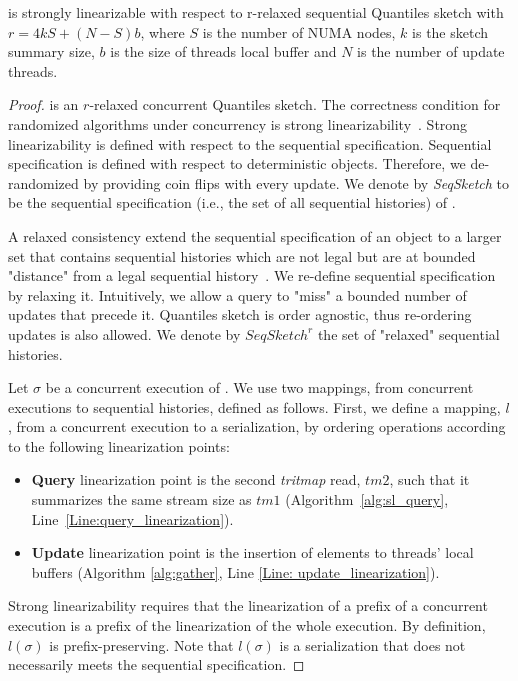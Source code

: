 \begin{lemma} \label{Lem: sl_relaxation}
\mysketch is strongly linearizable with respect to r-relaxed sequential Quantiles sketch with \(r=4kS + (N-S)b\), where $S$ is the number of NUMA nodes, $k$ is the sketch summary size, $b$ is the size of threads local buffer and $N$ is the number of update threads.
\end{lemma}
\begin{proof}
\mysketch is an $r$-relaxed concurrent Quantiles sketch. 
The correctness condition for randomized algorithms under concurrency is strong linearizability~\cite{strong_linearizability}. Strong linearizability is defined with respect to the sequential specification. Sequential specification is defined with respect to deterministic objects. Therefore, we de-randomized \mysketch by providing coin flips with every update. We denote by \emph{SeqSketch} to be the sequential specification (i.e., the set of all sequential histories) of \mysketch.


A relaxed consistency extend the sequential specification of an object to a larger set that contains sequential histories which are not legal but are at bounded "distance" from a legal sequential history~\cite{Henzinger_2013_Quantitative_Relaxation,Afek_2010_Quasi_linearizability,Rinberg_2020_fast_sketches}. We re-define \mysketch sequential specification by relaxing it. Intuitively, we allow a query to "miss" a bounded number of updates that precede it. Quantiles sketch is order agnostic, thus re-ordering updates is also allowed. We denote by $SeqSketch^r$ the set of "relaxed" sequential histories.

Let $\sigma$ be a concurrent execution of \mysketch. We use two mappings, from concurrent executions to sequential histories, defined as follows.
First, we define a mapping, $l$, from a concurrent execution to a serialization, by ordering operations according to the following linearization points:
\begin{itemize}
\item \textbf{Query} linearization point is the second \emph{tritmap} read, $tm2$, such that it summarizes the same stream size as $tm1$ (Algorithm~\ref{alg:sl_query}, Line~\ref{Line:query_linearization}).
\item \textbf{Update} linearization point is the insertion of elements to threads' local buffers (Algorithm \ref{alg:gather}, Line \ref{Line: update_linearization}).
\end{itemize}

Strong linearizability requires that the linearization of a prefix of a concurrent execution is a prefix of the linearization of the whole execution. By definition, $l(\sigma)$ is prefix-preserving. Note that $l(\sigma)$ is a serialization that does not necessarily meets the sequential specification.


\end{proof}
